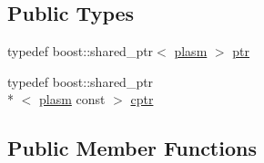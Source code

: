 \subsection*{Public Types}
\begin{DoxyCompactItemize}
\item 
typedef boost\-::shared\-\_\-ptr$<$ \hyperlink{structecto_1_1plasm}{plasm} $>$ \hyperlink{structecto_1_1plasm_a899b9da452ab35849f07038c90990ac3}{ptr}
\item 
typedef boost\-::shared\-\_\-ptr\\*
$<$ \hyperlink{structecto_1_1plasm}{plasm} const  $>$ \hyperlink{structecto_1_1plasm_afd3b9e2d4732023ab9e94553e0d66ac4}{cptr}
\end{DoxyCompactItemize}
\subsection*{Public Member Functions}
